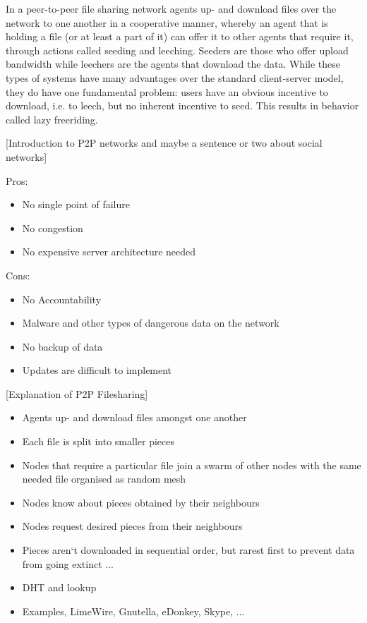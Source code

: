 \documentclass[11pt,a4paper]{report}
\theoremstyle{definition}
\theoremstyle{theorem}
\theoremstyle{proposition}
\theoremstyle{corollary}
\theoremstyle{lemma}
\theoremstyle{example}
\theoremstyle{remark}
\begin{document}
\noindent In a peer-to-peer file sharing network agents up- and download files over the network to one another in a cooperative manner, whereby an agent that is holding a file (or at least a part of it) can offer it to other agents that require it, through actions called seeding and leeching. Seeders are those who offer upload bandwidth while leechers are the agents that download the data. While these types of systems have many advantages over the standard client-server model, they do have one fundamental problem: users have an obvious incentive to download, i.e. to leech, but no inherent incentive to seed. This results in behavior called lazy freeriding. \vspace{1em}\\

\noindent{} \begin{center} [Introduction to P2P networks and maybe a sentence or two about social networks]\vspace{1em}\\ \end{center}
Pros:
\begin{itemize}
\item No single point of failure
\item No congestion
\item No expensive server architecture needed 
\end{itemize}
Cons:
\begin{itemize}
\item No Accountability
\item Malware and other types of dangerous data on the network
\item No backup of data
\item Updates are difficult to implement
\end{itemize}

\noindent{} \begin{center} [Explanation of P2P Filesharing] \vspace{1em}\\ \end{center} 
\begin{itemize}
\item Agents up- and download files amongst one another
\item Each file is split into smaller pieces
\item Nodes that require a particular file join a swarm of other nodes with the same needed file organised as random mesh
\item Nodes know about pieces obtained by their neighbours
\item Nodes request desired pieces from their neighbours
\item Pieces aren‘t downloaded in sequential order, but rarest first to prevent data from going extinct ...
\item DHT and lookup
\item Examples, LimeWire, Gnutella, eDonkey, Skype, ... \vspace{1em}\\
\end{itemize}
\end{document}
